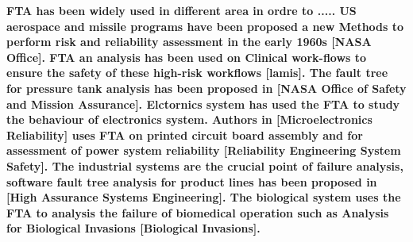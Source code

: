 \documentclass[10pt]{llncs}
\begin{document}
			
%

\textbf{FTA has been widely used in different area in ordre to .....
US aerospace and missile programs have been proposed a new Methods to perform risk and reliability assessment in the early 1960s [NASA Office]. FTA an analysis has been used on Clinical work-flows to ensure the safety of these high-risk workflows [lamis]. The fault tree for pressure tank analysis has been proposed in [NASA Office of Safety and Mission Assurance].
Elctornics system has used the FTA to study the behaviour of electronics system. Authors in [Microelectronics Reliability] uses FTA on printed circuit board assembly and 
for assessment of power system reliability [Reliability Engineering  System Safety]. The industrial systems are the crucial point of failure analysis, software fault tree analysis for product lines has been proposed in  [High Assurance Systems Engineering]. The biological system uses the FTA to analysis the failure of biomedical operation such as Analysis for Biological Invasions  [Biological Invasions].}
 
\end{document}
